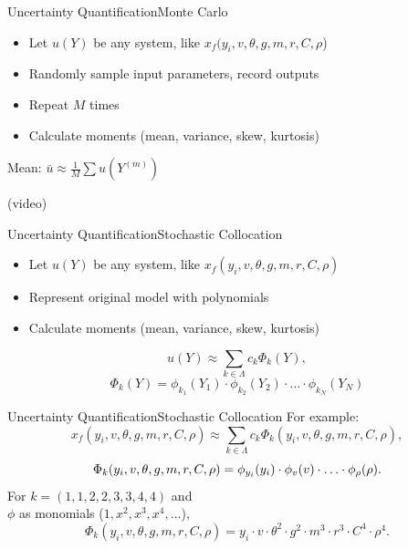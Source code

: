 \documentclass{beamer}
\begin{document}
\begin{frame}{Uncertainty Quantification}{Monte Carlo}\vspace{-30pt}
\begin{itemize}
\item Let $u(Y)$ be any system, like $x_f(y_i,v,\theta,g,m,r,C,\rho$)
\item Randomly sample input parameters, record outputs
\item Repeat $M$ times
\item Calculate moments (mean, variance, skew, kurtosis)
\end{itemize}
\centerline{Mean: $\bar u\approx\frac{1}{M}\sum u\left(Y^{(m)}\right)$}
(video)
\end{frame}

\begin{frame}{Uncertainty Quantification}{Stochastic Collocation}\vspace{-30pt}
\begin{itemize}
\item Let $u(Y)$ be any system, like $x_f(y_i,v,\theta,g,m,r,C,\rho)$
\item Represent original model with polynomials
\item Calculate moments (mean, variance, skew, kurtosis)
\end{itemize}
\begin{equation*}
u(Y)\approx\sum_{k\in\Lambda}c_k\Phi_k(Y),
\end{equation*}
\begin{equation*}
\Phi_k(Y) = \phi_{k_1}(Y_1)\cdot\phi_{k_2}(Y_2)\cdot\ldots\cdot\phi_{k_N}(Y_N)
\end{equation*}
\end{frame}

\begin{frame}{Uncertainty Quantification}{Stochastic Collocation}\vspace{-20pt}
For example:
\begin{equation*}
x_f(y_i,v,\theta,g,m,r,C,\rho)\approx\sum_{k\in\Lambda}c_k\Phi_k(y_i,v,\theta,g,m,r,C,\rho),
\end{equation*}
\begin{equation*}
\Phi_k(y_i,v,\theta,g,m,r,C,\rho) = \phi_{y_i}(y_i)\cdot\phi_{v}(v)\cdot\ldots\cdot\phi_{\rho}(\rho).\vspace{10pt}
\end{equation*}
For $k=(1,1,2,2,3,3,4,4)$ and \\$\phi$ as monomials ($1,x^2,x^3,x^4,\ldots$),
\begin{equation*}
\Phi_k(y_i,v,\theta,g,m,r,C,\rho) = y_i\cdot v\cdot \theta^2\cdot g^2\cdot m^3\cdot r^3\cdot C^4\cdot \rho^4.
\end{equation*}
\end{frame}
\end{document}
